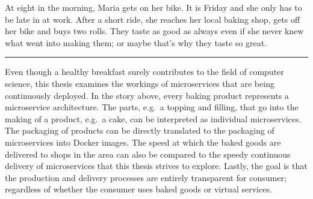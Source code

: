 At eight in the morning, Maria gets on her bike. It is Friday and she only has
to be late in at work. After a short ride, she reaches her local baking shop,
gets off her bike and buys two rolls. They taste as good as always even if she
never knew what went into making them; or maybe that's why they taste so great.

\rule{2cm}{0.4pt}

Even though a healthy breakfast surely contributes to the field of computer
science, this thesis examines the workings of microservices that are being
continuously deployed. In the story above, every baking product represents a
microservice architecture. The parts, e.g.\ a topping and filling, that go into
the making of a product, e.g.\ a cake, can be interpreted as individual
microservices. The packaging of products can be directly translated to the
packaging of microservices into Docker images. The speed at which the baked
goods are delivered to shops in the area can also be compared to the speedy
continuous delivery of microservices that this thesis strives to explore.
Lastly, the goal is that the production and delivery processes are entirely
transparent for consumer; regardless of whether the consumer uses baked goods
or virtual services.
